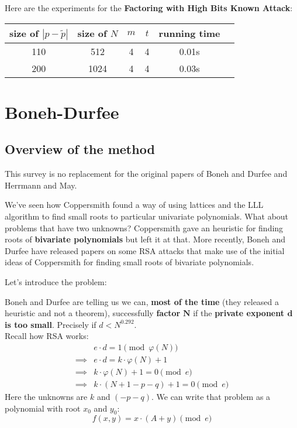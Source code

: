 \documentclass[a4paper,11pt]{article}
\begin{document}
Here are the experiments for the \textbf{Factoring with High Bits Known Attack}:

\begin{center} 
\begin{tabular}{@{}  *6c @{}}
\toprule
 size of $|p - \tilde{p}|$ & size of $N$ & $m$ & $t$ & running time \\ 
\midrule
 110 & 512 & 4 & 4 & 0.01s\\ 
 200 & 1024 & 4 & 4 & 0.03s\\
\bottomrule
\end{tabular}
\end{center} 

\section{Boneh-Durfee}\label{bonehdurfee}

\subsection{Overview of the method}\label{overview}
This survey is no replacement for the original papers of Boneh and Durfee\cite{bonehdurfee} and Herrmann and May\cite{herrmannmay}.

We've seen how Coppersmith found a way of using lattices and the LLL algorithm to find small roots to particular univariate polynomials. What about problems that have two unknowns? Coppersmith gave an heuristic for finding roots of \textbf{bivariate polynomials} but left it at that. More recently, Boneh and Durfee have released papers on some RSA attacks that make use of the initial ideas of Coppersmith for finding small roots of bivariate polynomials.

Let's introduce the problem:

Boneh and Durfee are telling us we can, \textbf{most of the time} (they released a heuristic and not a theorem), successfully \textbf{factor} $\textbf{N}$ if the \textbf{private exponent $\textbf{d}$ is too small}. Precisely if $d < N^{0.292}$.\\

Recall how RSA works:
\begin{align*}
&e \cdot d = 1 \pmod{\varphi(N)}\\
\implies& e \cdot d = k \cdot \varphi(N) + 1\\
\implies& k \cdot \varphi(N) + 1 = 0 \pmod{e}\\
\implies& k \cdot (N + 1 - p - q) + 1 = 0 \pmod{e}
\end{align*}
Here the unknowns are $k$ and $(-p-q)$. We can write that problem as a polynomial with root $x_0$ and $y_0$:
\[ f(x,y) = x \cdot (A + y) \pmod{e} \]
\end{document}
